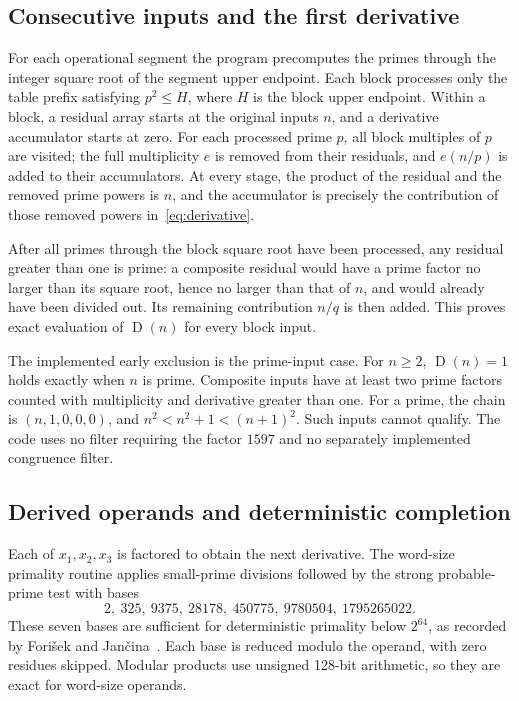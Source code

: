 \documentclass[11pt,a4paper]{article}
\theoremstyle{remark}
\newcommand{\D}{\operatorname{D}}
\begin{document}
\subsection{Consecutive inputs and the first derivative}
For each operational segment the program precomputes the primes through the
integer square root of the segment upper endpoint. Each block processes
only the table prefix satisfying $p^2\le H$, where $H$ is the block upper
endpoint. Within a block, a residual array
starts at the original inputs $n$, and a derivative accumulator starts at
zero. For each processed prime $p$, all block multiples of $p$ are visited;
the full multiplicity $e$ is removed from their residuals, and $e(n/p)$ is
added to their accumulators. At every stage, the product of the residual
and the removed prime powers is $n$, and the accumulator is precisely the
contribution of those removed powers in~\eqref{eq:derivative}.

After all primes through the block square root have been processed, any
residual greater than one is prime: a composite residual would have a prime
factor no larger than its square root, hence no larger than that of $n$,
and would already have been divided out. Its remaining contribution $n/q$
is then added. This proves exact evaluation of $\D(n)$ for every block input.

The implemented early exclusion is the prime-input case. For $n\ge2$,
$\D(n)=1$ holds exactly when $n$ is prime. Composite inputs have at least
two prime factors counted with multiplicity and derivative greater than one.
For a prime, the chain is $(n,1,0,0,0)$, and
$n^2<n^2+1<(n+1)^2$. Such inputs cannot qualify. The code uses no filter
requiring the factor $1597$ and no separately implemented congruence filter.

\subsection{Derived operands and deterministic completion}
Each of $x_1,x_2,x_3$ is factored to obtain the next derivative. The word-size
primality routine applies small-prime divisions followed by the strong
probable-prime test with bases
\[
2,\ 325,\ 9375,\ 28178,\ 450775,\ 9780504,\ 1795265022.
\]
These seven bases are sufficient for deterministic primality below $2^{64}$,
as recorded by Fori\v{s}ek and Jan\v{c}ina~\cite[Theorem 3]{forisek}.
Each base is reduced modulo the operand, with zero residues skipped.
Modular products use unsigned 128-bit arithmetic, so they are exact for
word-size operands.
\end{document}
